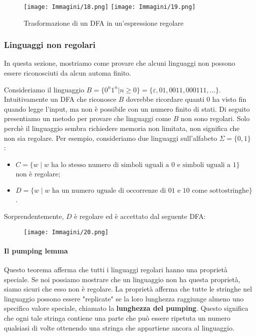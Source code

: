\documentclass{article}
\begin{document}
\begin{figure}[H]
    \centering
    \texttt{[image: Immagini/18.png]}
    \texttt{[image: Immagini/19.png]}
    \caption{Trasformazione di un DFA in un'espressione regolare}
    \label{fig:your_image}
\end{figure}

\subsubsection{Linguaggi non regolari}

In questa sezione, mostriamo come provare che alcuni linguaggi non possono essere riconosciuti da alcun automa finito.

Consideriamo il linguaggio $B = \{0^{n}1^{n}|n \geq 0\} = \{\varepsilon,01,0011,000111,...\}$. Intuitivamente un DFA che riconosce $B$ dovrebbe ricordare quanti $0$ ha visto fin quando legge l'input, ma non è possibile con un numero finito di stati.
Di seguito presentiamo un metodo per provare che linguaggi come $B$ non sono regolari.
Solo perchè il linguaggio sembra richiedere memoria non limitata, non significa che non sia regolare.
Per esempio, consideriamo due linguaggi sull'alfabeto $\Sigma = \{0,1\}$:
\begin{itemize}
    \item $C = \{w \mid w \text{ ha lo stesso numero di simboli uguali a 0 e simboli uguali a 1}\}$ non è regolare;
    \item $D = \{w \mid w \text{ ha un numero uguale di occorrenze di 01 e 10 come sottostringhe}\}$.
\end{itemize}

Sorprendentemente, $D$ è regolare ed è accettato dal seguente DFA:

\begin{figure}[H]
    \centering
    \texttt{[image: Immagini/20.png]}
    \label{fig:your_image}
\end{figure}

\paragraph{Il pumping lemma}
\vspace{1em}
\text{}
\newline
Questo teorema afferma che tutti i linguaggi regolari hanno una proprietà speciale. Se noi possiamo mostrare che un linguaggio non ha questa proprietà, siamo sicuri che esso non è regolare. La proprietà afferma che tutte le stringhe nel linguaggio possono essere "replicate" se la loro lunghezza raggiunge almeno uno specifico valore speciale, chiamato la \textbf{lunghezza del pumping}. Questo significa che ogni tale stringa contiene una parte che può essere ripetuta un numero qualsiasi di volte ottenendo una stringa che appartiene ancora al linguaggio.
\end{document}

